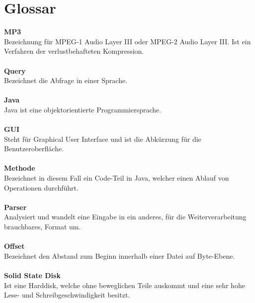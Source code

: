 \documentclass[12pt,a4paper,ngerman]{report}
\begin{document}
\chapter*{Glossar}
\textbf{MP3}\\
Bezeichnung für MPEG-1 Audio Layer III oder MPEG-2 Audio Layer III. Ist ein Verfahren der verlustbehafteten Kompression.\\ \\
\textbf{Query}\\
Bezeichnet die Abfrage in einer Sprache. \\ \\
\textbf{Java}\\
Java ist eine objektorientierte Programmiersprache. \\ \\
\textbf{GUI}\\
Steht für Graphical User Interface und ist die Abkürzung für die Benutzeroberfläche. \\ \\
\textbf{Methode}\\
Bezeichnet in diesem Fall ein Code-Teil in Java, welcher einen Ablauf von Operationen durchführt. \\ \\
\textbf{Parser}\\
Analysiert und wandelt eine Eingabe in ein anderes, für die Weiterverarbeitung brauchbares, Format um. \\ \\
\textbf{Offset}\\
Bezeichnet den Abstand zum Beginn innerhalb einer Datei auf Byte-Ebene. \\ \\ 
\textbf{Solid State Disk} \\
Ist eine Harddisk, welche ohne beweglichen Teile auskommt und eine sehr hohe Lese- und Schreibgeschwindigkeit besitzt.


\nocite{jaudiotagger}
\nocite{lucene1}
\nocite{tika}
\nocite{id31}
\nocite{id32}
\nocite{anut}
\nocite{netzwertig}
\nocite{scinexx1}
\nocite{fingerabdruck}
\nocite{scinexx2}
\nocite{shazam1}
\nocite{mp3}
\nocite{query}
\nocite{modinf}
\nocite{lucene2}
\end{document}
